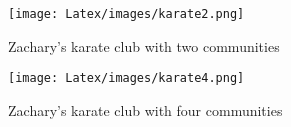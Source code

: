 \begin{figure}[htbp]
\centering
\texttt{[image: Latex/images/karate2.png]}
\caption{Zachary's karate club with two communities}
\label{fig:karate2c}
\end{figure}

\begin{figure}[htbp]
\centering
\texttt{[image: Latex/images/karate4.png]}
\caption{Zachary's karate club with four communities}
\label{fig:karate4c}
\end{figure}